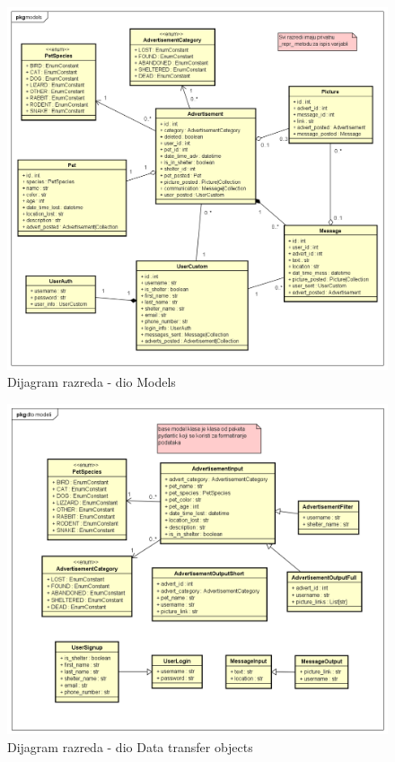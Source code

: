 			\begin{figure}[H]
				\includegraphics[scale=0.55]{dijagrami/dijagramiRazreda/Models.PNG} %
				\centering
				\caption{Dijagram razreda - dio Models}
				\label{fig:drModels}
			\end{figure}
			
			\begin{figure}[H]
				\includegraphics[scale=0.55]{dijagrami/dijagramiRazreda/dto.PNG} %
				\centering
				\caption{Dijagram razreda - dio Data transfer objects}
				\label{fig:drDataTransferObjects}
			\end{figure}
			
